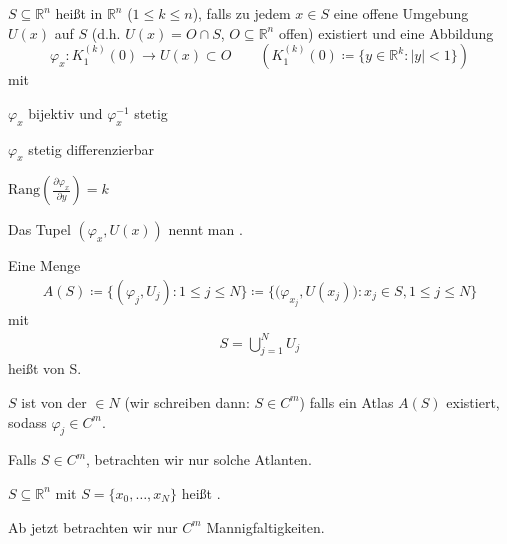 \begin{theorem}[Definition] \label{thm:9.1}
  \begin{enum-arab}
    \item $S \subseteq \mathbb{R}^n$ heißt  in $\mathbb{R}^n$ ($1 \leq k \leq n$), falls zu jedem $x \in S$ eine offene Umgebung $U(x)$ auf $S$ (d.h. $U(x) = O \cap S$, $O \subseteq \mathbb{R}^n$ offen) existiert und eine Abbildung \[ \varphi_x : K_1^{(k)}(0) \to U(x) \subset O \qquad \left( K_1^{(k)}(0) \coloneq \{ y \in \mathbb{R}^k : |y| < 1 \} \right) \] mit
    \begin{enum-alph}
      \item $\varphi_x$ bijektiv und $\varphi_x^{-1}$ stetig
      \item $\varphi_x$ stetig differenzierbar
      \item $\mathrm{Rang}(\tfrac{\partial \varphi_x}{\partial y}) = k$
    \end{enum-alph}
    Das Tupel $(\varphi_x,U(x))$ nennt man .
    
    \item Eine Menge
    \begin{align*}
      A(S) \coloneq \big\{ (\varphi_j,U_j) : 1 \leq j \leq N \big\} 
      \coloneq \Big\{ \big(\varphi_{x_j},U(x_j)\big) : x_j \in S, 1 \leq j \leq N \Big\}
    \end{align*}
    mit
    \begin{align*}
      S = \bigcup\limits_{j=1}^{N} U_j
    \end{align*}
    heißt  von S.
    
    \item $S$ ist von der  $\in N$ (wir schreiben dann: $S \in C^m$) falls ein Atlas $A(S)$ existiert, sodass $\varphi_j \in C^m$.
    
      Falls $S \in C^m$, betrachten wir nur solche Atlanten.

    \item $S \subseteq \mathbb{R}^n$ mit $S = \{ x_0,\ldots,x_N \}$ heißt  .
  \end{enum-arab}
\end{theorem}

\begin{theorem}[Vereinbarung] \label{thm:9.2}
  Ab jetzt betrachten wir nur $C^m$ Mannigfaltigkeiten.
\end{theorem}

